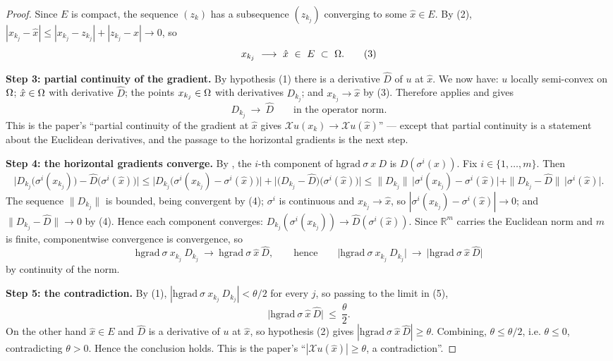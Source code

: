 \begin{proof}
Since $E$ is compact, the sequence $(z_k)$ has a subsequence $(z_{k_j})$ converging to some
$\hat x\in E$. By (2), $|x_{k_j}-\hat x|\le|x_{k_j}-z_{k_j}|+|z_{k_j}-\hat x|\to0$, so
\[
 x_{k_j}\ \longrightarrow\ \hat x\ \in\ E\ \subset\ \Om . \tag{3}
\]

\medskip\noindent\textbf{Step 3: partial continuity of the gradient.} By hypothesis (1)
there is a derivative $\hat D$ of $u$ at $\hat x$. We now have: $u$ locally semi-convex on
$\Omega$; $\hat x\in\Omega$ with derivative $\hat D$; the points $x_{k_j}\in\Omega$ with derivatives
$D_{k_j}$; and $x_{k_j}\to\hat x$ by (3). Therefore 
applies and gives
\[
 D_{k_j}\ \longrightarrow\ \hat D\qquad\text{in the operator norm.} \tag{4}
\]
This is the paper's ``partial continuity of the gradient at $\hat x$ gives
$\mathcal Xu(x_k)\to\mathcal Xu(\hat x)$'' --- except that partial continuity is a statement
about the Euclidean derivatives, and the passage to the horizontal gradients is the next
step.

\medskip\noindent\textbf{Step 4: the horizontal gradients converge.} By ,
the $i$-th component of $\mathrm{hgrad}\ \sigma\ x\ D$ is $D(\sigma^{i}(x))$. Fix
$i\in\{1,\ldots,m\}$. Then
\[
 \Big|D_{k_j}\big(\sigma^{i}(x_{k_j})\big)-\hat D\big(\sigma^{i}(\hat x)\big)\Big|
 \le\Big|D_{k_j}\big(\sigma^{i}(x_{k_j})-\sigma^{i}(\hat x)\big)\Big|
  +\Big|\big(D_{k_j}-\hat D\big)\big(\sigma^{i}(\hat x)\big)\Big|
 \le\|D_{k_j}\|\,\big|\sigma^{i}(x_{k_j})-\sigma^{i}(\hat x)\big|
  +\|D_{k_j}-\hat D\|\,\big|\sigma^{i}(\hat x)\big| .
\]
The sequence $\|D_{k_j}\|$ is bounded, being convergent by (4); $\sigma^{i}$ is continuous
and $x_{k_j}\to\hat x$, so $|\sigma^{i}(x_{k_j})-\sigma^{i}(\hat x)|\to0$; and
$\|D_{k_j}-\hat D\|\to0$ by (4). Hence each component converges:
$D_{k_j}(\sigma^{i}(x_{k_j}))\to\hat D(\sigma^{i}(\hat x))$. Since $\mathbb R^{m}$ carries
the Euclidean norm and $m$ is finite, componentwise convergence is convergence, so
\[
 \mathrm{hgrad}\ \sigma\ x_{k_j}\ D_{k_j}\ \longrightarrow\
 \mathrm{hgrad}\ \sigma\ \hat x\ \hat D ,\qquad\text{hence}\qquad
 \big|\mathrm{hgrad}\ \sigma\ x_{k_j}\ D_{k_j}\big|\ \longrightarrow\
 \big|\mathrm{hgrad}\ \sigma\ \hat x\ \hat D\big| \tag{5}
\]
by continuity of the norm.

\medskip\noindent\textbf{Step 5: the contradiction.} By (1),
$|\mathrm{hgrad}\ \sigma\ x_{k_j}\ D_{k_j}|<\theta/2$ for every $j$, so passing to the
limit in (5),
\[
 \big|\mathrm{hgrad}\ \sigma\ \hat x\ \hat D\big|\ \le\ \frac\theta2 .
\]
On the other hand $\hat x\in E$ and $\hat D$ is a derivative of $u$ at $\hat x$, so
hypothesis (2) gives $|\mathrm{hgrad}\ \sigma\ \hat x\ \hat D|\ge\theta$. Combining,
$\theta\le\theta/2$, i.e. $\theta\le0$, contradicting $\theta>0$. Hence the conclusion
holds. This is the paper's ``$|\mathcal Xu(\hat x)|\ge\theta$, a contradiction''.
\end{proof}
